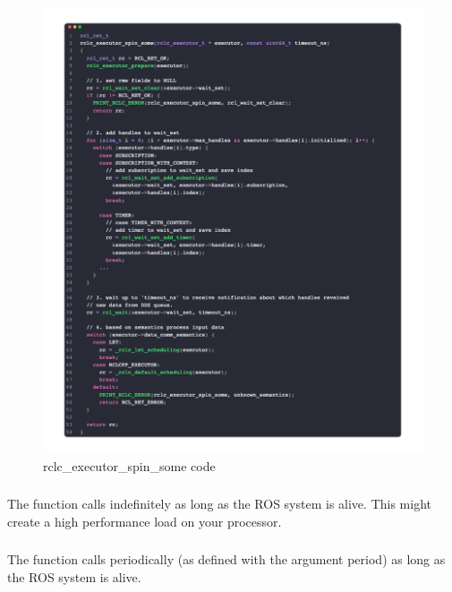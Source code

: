 \begin{figure}[htbp!]
    \vspace{-0.3in}
    \centering
    \includegraphics[width=1\linewidth]{Img/code/rclc/rclc_executor_spin_some.png}
    \caption{rclc\_executor\_spin\_some code}
    \vspace{-0.1in}
\end{figure}

\subsubsection{}
The function  calls  indefinitely as long as the ROS system is alive. This might create a high performance load on your processor.

\subsubsection{}
The function  calls  periodically (as defined with the argument period) as long as the ROS system is alive.


